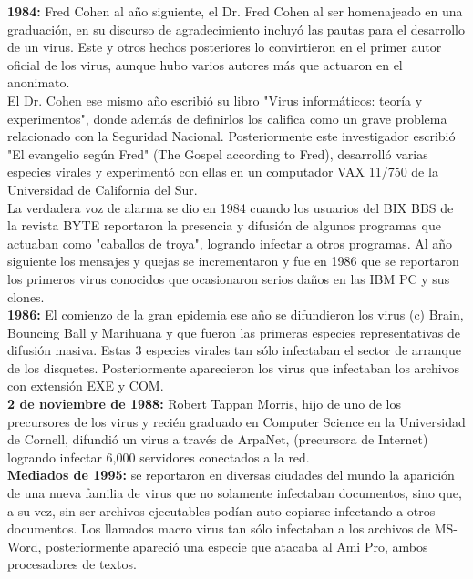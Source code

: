 \documentclass[12pt,a4paper]{article}
\begin{document}
	\textbf{1984:} Fred Cohen al año siguiente, el Dr. Fred Cohen al ser homenajeado en una graduación, en su discurso de agradecimiento incluyó las pautas para el desarrollo de un virus. Este y otros hechos posteriores lo convirtieron en el primer autor oficial de los virus, aunque hubo varios autores más que actuaron en el anonimato.\\
	
	El Dr. Cohen ese mismo año escribió su libro "Virus informáticos: teoría y experimentos", donde además de definirlos los califica como un grave problema relacionado con la Seguridad Nacional. Posteriormente este investigador escribió "El evangelio según Fred" (The Gospel according to Fred), desarrolló varias especies virales y experimentó con ellas en un computador VAX 11/750 de la Universidad de California del Sur.\\
	
	La verdadera voz de alarma se dio en 1984 cuando los usuarios del BIX BBS de la revista BYTE reportaron la presencia y difusión de algunos programas que actuaban como "caballos de troya", logrando infectar a otros programas. Al año siguiente los mensajes y quejas se incrementaron y fue en 1986 que se reportaron los primeros virus conocidos que ocasionaron serios daños en las IBM PC y sus clones.\\
	
	\textbf{1986:} El comienzo de la gran epidemia ese año se difundieron los virus (c) Brain, Bouncing Ball y Marihuana y que fueron las primeras especies representativas de difusión masiva. Estas 3 especies virales tan sólo infectaban el sector de arranque de los disquetes. Posteriormente aparecieron los virus que infectaban los archivos con extensión EXE y COM.\\
	
	\textbf{2 de noviembre de 1988:} Robert Tappan Morris, hijo de uno de los precursores de los virus y recién graduado en Computer Science en la Universidad de Cornell, difundió un virus a través de ArpaNet, (precursora de Internet) logrando infectar 6,000 servidores conectados a la red.\\
	
	\textbf{Mediados de 1995:} se reportaron en diversas ciudades del mundo la aparición de una nueva familia de virus que no solamente infectaban documentos, sino que, a su vez, sin ser archivos ejecutables podían auto-copiarse infectando a otros documentos. Los llamados macro virus tan sólo infectaban a los archivos de MS-Word, posteriormente apareció una especie que atacaba al Ami Pro, ambos procesadores de textos.\\
	
\end{document}
